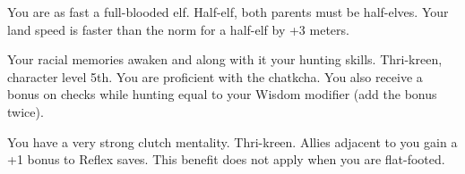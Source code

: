 {You are as fast a full-blooded elf.}
{Half-elf, both parents must be half-elves.}
{Your land speed is faster than the norm for a half-elf by +3 meters.}
{}{}

{Your racial memories awaken and along with it your hunting skills.}
{Thri-kreen, character level 5th.}
{You are proficient with the chatkcha. You also receive a bonus on  checks while hunting equal to your Wisdom modifier (add the bonus twice).}
{}{}

{You have a very strong clutch mentality.}
{Thri-kreen.}
{Allies adjacent to you gain a +1 bonus to Reflex saves. This benefit does not apply when you are flat-footed.}
{}{}